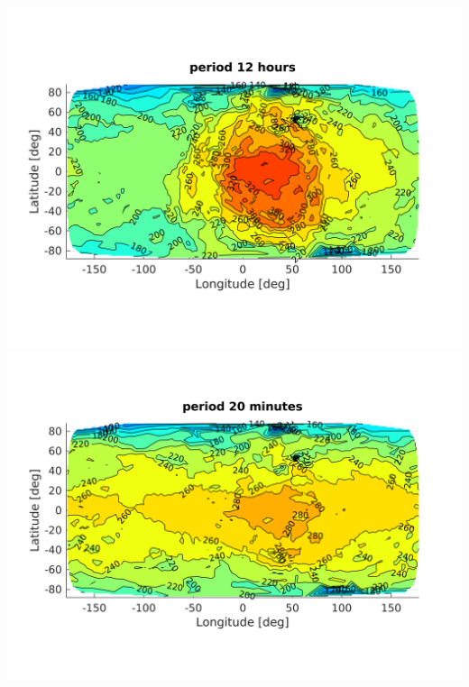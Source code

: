 \begin{center}
    \includegraphics[width=\linewidth]{rsc/theo12h.png}
    \includegraphics[width=\linewidth]{rsc/theo20mn.png}
\end{center}
